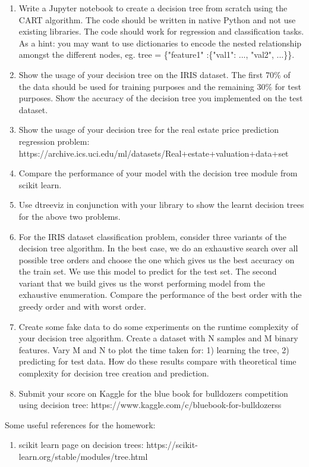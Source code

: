 \documentclass[]{article}
\begin{document}
\begin{enumerate}
	\item Write a Jupyter notebook to create a decision tree from scratch using the CART algorithm. The code should be written in native Python and not use existing libraries. The code should work for regression and classification tasks. As a hint: you may want to use dictionaries to encode the nested relationship amongst the different nodes, eg. tree = \{"feature1" :\{"val1": ..., "val2", ...\}\}.
	\item Show the usage of your decision tree on the IRIS dataset. The first 70\% of the data should be used for training purposes and the remaining 30\% for test purposes. Show the accuracy of the decision tree you implemented on the test dataset.
	\item Show the usage of your decision tree for the real estate price prediction regression problem: https://archive.ics.uci.edu/ml/datasets/Real+estate+valuation+data+set
	\item Compare the performance of your model with the decision tree module from scikit learn.
	\item Use dtreeviz in conjunction with your library to show the learnt decision trees for the above two problems.
	\item For the IRIS dataset classification problem, consider three variants of the decision tree algorithm. In the best case, we do an exhaustive search over all possible tree orders and choose the one which gives us the best accuracy on the train set. We use this model to predict for the test set. The second variant that we build gives us the worst performing model from the exhaustive enumeration. Compare the performance of the best order with the greedy order and with worst order.
	\item Create some fake data to do some experiments on the runtime complexity of your decision tree algorithm. Create a dataset with N samples and M binary features. Vary M and N to plot the time taken for: 1) learning the tree, 2) predicting for test data. How do these results compare with theoretical time complexity for decision tree creation and prediction.
	\item Submit your score on Kaggle for the blue book for bulldozers competition using decision tree: https://www.kaggle.com/c/bluebook-for-bulldozerss
	
	
	

\end{enumerate}


Some useful references for the homework:

\begin{enumerate}
	\item scikit learn page on decision trees: https://scikit-learn.org/stable/modules/tree.html
\end{enumerate}
\end{document}

